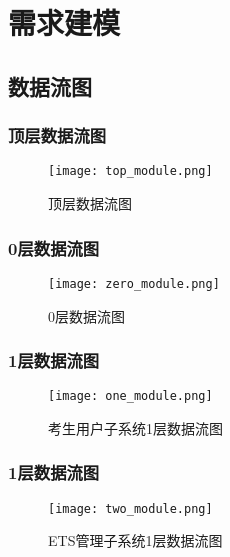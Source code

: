 \chapter{需求建模 }
\section{数据流图}
\subsection{顶层数据流图}
\begin{figure}[ht]
\centering
\texttt{[image: top\_module.png]}
\caption{顶层数据流图}\label{fig:noted-figure}
\end{figure}


\subsection{0层数据流图}
\begin{figure}[htb]
\centering
\texttt{[image: zero\_module.png]}
\caption{0层数据流图}\label{fig:noted-figure}
\end{figure}

\subsection{1层数据流图}
\begin{figure}[htb]
\centering
\texttt{[image: one\_module.png]}
\caption{考生用户子系统1层数据流图}\label{fig:noted-figure}
\end{figure}

\subsection{1层数据流图}
\begin{figure}[htb]
\centering
\texttt{[image: two\_module.png]}
\caption{ETS管理子系统1层数据流图}\label{fig:noted-figure}
\end{figure}

